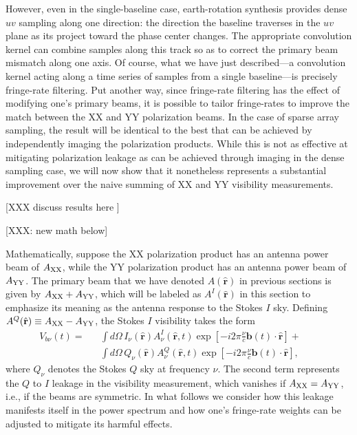 \documentclass[twocolumn,apj,numberedappendix]{emulateapj}
\newcommand{\rhat}{\hat{\mathbf{r}}}
\begin{document}
However, even in the single-baseline case, earth-rotation synthesis provides dense $uv$ sampling along one direction: the
direction the baseline traverses in the $uv$ plane as its project toward the phase center changes.  The appropriate
convolution kernel can combine samples along this track so as to correct the primary beam mismatch along one axis.
Of course, what we have just described---a convolution kernel acting along a time series
of samples from a single baseline---is precisely fringe-rate filtering.  Put another way, since fringe-rate filtering has the effect of modifying one's primary beams, it is possible to tailor fringe-rates to improve the match between the XX and YY polarization beams. In the case of sparse array sampling, the result will be identical to the best that can be achieved by independently
imaging the polarization products.  While this is not as effective at mitigating polarization leakage as can be achieved
through imaging in the dense sampling case, we will now show that it nonetheless represents a substantial improvement
over the naive summing of XX and YY visibility measurements.

[XXX discuss results here ]

[XXX: new math below]

Mathematically, suppose the XX polarization product has an antenna power beam of $A_{\rm XX}$, while the YY 
polarization product has an antenna power beam of $A_{\rm YY}$. The primary beam that we have denoted $A(\rhat)$ 
in previous sections is given by $A_{\rm XX} + A_{\rm YY}$, which will be labeled as $A^I(\rhat)$ in this section to emphasize
its meaning as the antenna response to the Stokes $I$ sky. Defining $A^Q(\rhat) \equiv A_{\rm XX} - A_{\rm YY}$, the
Stokes $I$ visibility takes the form
\begin{eqnarray}
V_{b\nu}(t)= &&\int d\Omega \, {I_\nu(\rhat) A^I_\nu(\rhat,t) \exp \left[-i2\pi \frac{\nu}{c}  \mathbf{b}(t) \cdot \rhat\right]} + \nonumber \\
&& \int d\Omega \, {Q_\nu(\rhat) A^Q_\nu(\rhat,t) \exp \left[-i2\pi \frac{\nu}{c}  \mathbf{b}(t) \cdot \rhat\right]}, \qquad
\end{eqnarray}
where $Q_\nu$ denotes the Stokes $Q$ sky at frequency $\nu$. The second term represents the $Q$ to $I$ leakage
in the visibility measurement, which vanishes if $ A_{\rm XX} = A_{\rm YY}$, i.e., if the beams are symmetric. In what follows we consider how this leakage manifests itself in the power spectrum
and how one's fringe-rate weights can be adjusted to mitigate its harmful effects.
\end{document}
